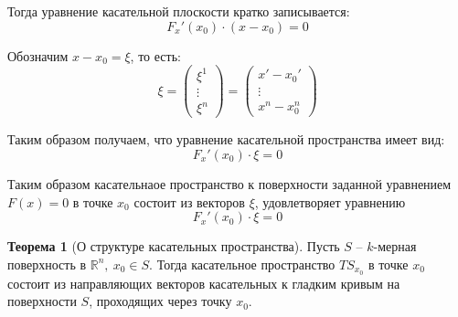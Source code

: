 \documentclass{report}
\theoremstyle{definition}
\newtheorem{theorem}{Теорема}[section]
\begin{document}
Тогда уравнение касательной плоскости кратко записывается:
\begin{equation*}
  F_x'(x_0)\cdot(x-x_0) = 0
\end{equation*}

Обозначим $x - x_0 = \xi$, то есть:
\begin{equation*}
  \xi = \left(\begin{array}{c}
    \xi^1  \\
    \vdots \\
    \xi^n
  \end{array}\right) = \left(\begin{array}{c}
    x'-x_0' \\
    \vdots  \\
    x^n-x_0^n
  \end{array}\right)
\end{equation*}

Таким образом получаем, что уравнение касательной пространства имеет вид:
\begin{equation*}
  F_x'(x_0)\cdot \xi = 0
\end{equation*}

Таким образом касательнаое пространство к поверхности заданной уравнением $F(x) = 0$ в точке $x_0$ состоит из векторов $\xi$, удовлетворяет уравнению
\begin{equation}
  F_x'(x_0)\cdot \xi = 0
\end{equation}

\begin{theorem}[О структуре касательных пространства]
  Пусть $S$ -- $k$-мерная поверхность в $\mathbb{R}^n, \ x_0 \in S$. Тогда касательное пространство $TS_{x_0}$ в точке $x_0$ состоит из направляющих векторов касательных к гладким кривым на поверхности $S$, проходящих через точку $x_0$.
\end{theorem}
\end{document}

